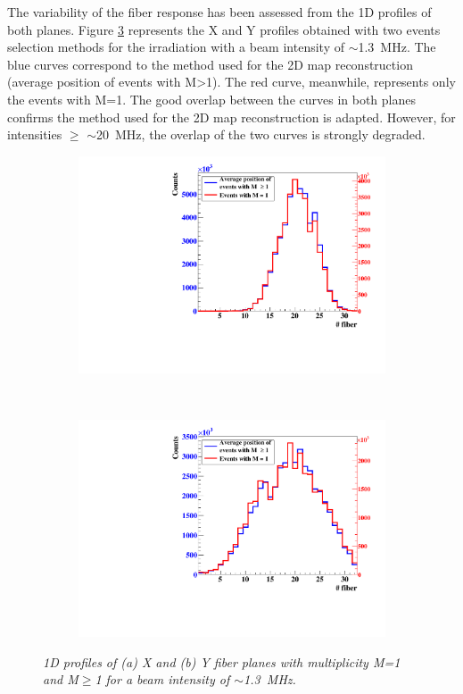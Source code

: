 \documentclass[a4paper,11pt]{article}
\begin{document}
The variability of the fiber response has been assessed from the 1D profiles of both planes. Figure \ref{fig:1D_Profiles} represents the X and Y profiles obtained with two events selection methods for the irradiation with a beam intensity of $\sim$1.3~MHz. The blue curves correspond to the method used  for the 2D map reconstruction (average position of events with M>1). The red curve, meanwhile, represents only the events with M=1. The good overlap between the curves in both planes confirms the method used for the 2D map reconstruction is adapted. However, for intensities $\geq$ $\sim$20~MHz, the overlap of the two curves is strongly degraded.

\begin{figure}[htb]
\centering
    \begin{subfigure}{0.47\textwidth} \centering \includegraphics[width=\textwidth]{figures/Plane_X_1MHz.pdf} \caption{} \label{fig:Plane_X_1MHz}
    \end{subfigure}
    ~
    \begin{subfigure}{0.47\textwidth} \centering \includegraphics[width=\textwidth]{figures/Plane_Y_1MHz.pdf} \caption{} \label{fig:Plane_Y_1MHz}
    \end{subfigure}
\caption{\small{\textit{1D profiles of (a) X and (b) Y fiber planes with multiplicity M=1 and M$\geq$1 for a beam intensity of $\sim${1.3}~MHz.}}}
\label{fig:1D_Profiles}
\end{figure}
\end{document}
